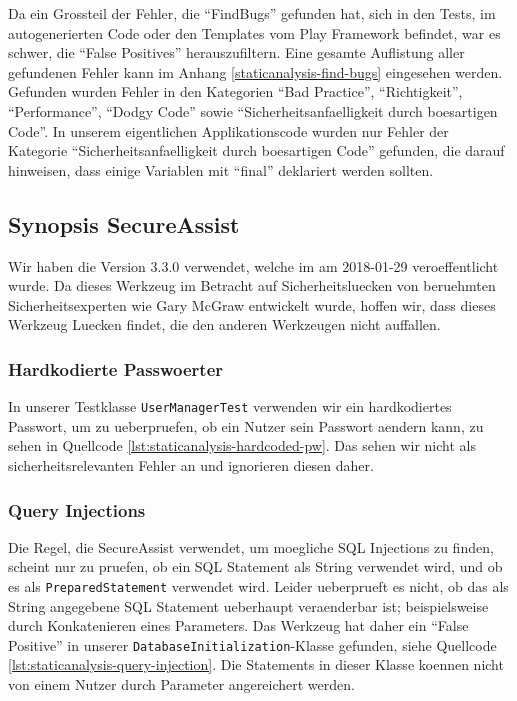 \documentclass[12pt,DIV14,BCOR10mm,a4paper,twoside,parskip=half-,headsepline,headinclude,english,ngerman,bibliography=totocnumbered]{scrreprt}
\begin{document}
Da ein Grossteil der Fehler, die \enquote{FindBugs} gefunden hat, sich in den Tests, im autogenerierten Code oder den Templates vom Play Framework befindet, war es schwer, die \enquote{False Positives} herauszufiltern.
Eine gesamte Auflistung aller gefundenen Fehler kann im Anhang \ref{staticanalysis-find-bugs} eingesehen werden.
Gefunden wurden Fehler in den Kategorien \enquote{Bad Practice}, \enquote{Richtigkeit}, \enquote{Performance}, \enquote{Dodgy Code} sowie \enquote{Sicherheitsanfaelligkeit durch boesartigen Code}.
In unserem eigentlichen Applikationscode wurden nur Fehler der Kategorie \enquote{Sicherheitsanfaelligkeit durch boesartigen Code} gefunden, die darauf hinweisen, dass einige Variablen mit \enquote{final} deklariert werden sollten.

\subsection{Synopsis SecureAssist}

Wir haben die Version 3.3.0 verwendet, welche im am 2018-01-29 veroeffentlicht wurde.
Da dieses Werkzeug im Betracht auf Sicherheitsluecken von beruehmten Sicherheitsexperten wie Gary McGraw entwickelt wurde, hoffen wir, dass dieses Werkzeug Luecken findet, die den anderen Werkzeugen nicht auffallen.

\subsubsection{Hardkodierte Passwoerter}

In unserer Testklasse \texttt{UserManagerTest} verwenden wir ein hardkodiertes Passwort, um zu ueberpruefen, ob ein Nutzer sein Passwort aendern kann, zu sehen in Quellcode \ref{lst:staticanalysis-hardcoded-pw}.
Das sehen wir nicht als sicherheitsrelevanten Fehler an und ignorieren diesen daher.

\subsubsection{Query Injections}

Die Regel, die SecureAssist verwendet, um moegliche SQL Injections zu finden, scheint nur zu pruefen, ob ein SQL Statement als String verwendet wird, und ob es als \texttt{PreparedStatement} verwendet wird.
Leider ueberprueft es nicht, ob das als String angegebene SQL Statement ueberhaupt veraenderbar ist; beispielsweise durch Konkatenieren eines Parameters.
Das Werkzeug hat daher ein \enquote{False Positive} in unserer \texttt{DatabaseInitialization}-Klasse gefunden, siehe Quellcode \ref{lst:staticanalysis-query-injection}.
Die Statements in dieser Klasse koennen nicht von einem Nutzer durch Parameter angereichert werden.
\end{document}
